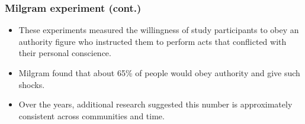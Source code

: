 \documentclass[slidestop,compress,mathserif]{beamer}
\begin{document}

\begin{frame}
\frametitle{Milgram experiment (cont.)}

\begin{itemize}

\item These experiments measured the willingness of study participants to obey an authority figure who instructed them to perform acts that conflicted with their personal conscience.

\item Milgram found that about 65\% of people would obey authority and give such shocks.

\item Over the years, additional research suggested this number is approximately consistent across communities and time.

\end{itemize}

\end{frame}


\end{document}
